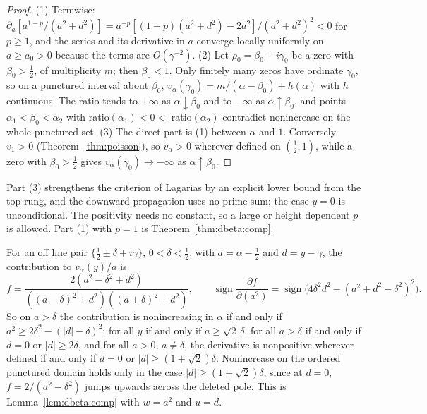 \begin{proof}
(1) Termwise: $\partial_a[a^{1-p}/(a^2+d^2)]=a^{-p}[(1-p)(a^2+d^2)-2a^2]/(a^2+d^2)^2<0$ for $p\ge1$, and the series and its derivative in $a$ converge locally uniformly on $a\ge a_0>0$ because the terms are $O(\gamma^{-2})$. (2) Let $\rho_0=\beta_0+i\gamma_0$ be a zero with $\beta_0>\tfrac12$, of multiplicity $m$; then $\beta_0<1$. Only finitely many zeros have ordinate $\gamma_0$, so on a punctured interval about $\beta_0$, $v_\alpha(\gamma_0)=m/(\alpha-\beta_0)+h(\alpha)$ with $h$ continuous. The ratio tends to $+\infty$ as $\alpha\downarrow\beta_0$ and to $-\infty$ as $\alpha\uparrow\beta_0$, and points $\alpha_1<\beta_0<\alpha_2$ with ratio$(\alpha_1)<0<$ ratio$(\alpha_2)$ contradict nonincrease on the whole punctured set. (3) The direct part is (1) between $\alpha$ and $1$. Conversely $v_1>0$ (Theorem~\ref{thm:poisson}), so $v_\alpha>0$ wherever defined on $(\tfrac12,1)$, while a zero with $\beta_0>\tfrac12$ gives $v_\alpha(\gamma_0)\to-\infty$ as $\alpha\uparrow\beta_0$.
\end{proof}

Part (3) strengthens the criterion of Lagarias by an explicit lower bound from the top rung, and the downward propagation uses no prime sum; the case $y=0$ is unconditional. The positivity needs no constant, so a large or height dependent $p$ is allowed. Part (1) with $p=1$ is Theorem~\ref{thm:dbeta:comp}.

\begin{lemma}\label{qt:lem:pairdiff}
For an off line pair $\{\tfrac12\pm\delta+i\gamma\}$, $0<\delta<\tfrac12$, with $a=\alpha-\tfrac12$ and $d=y-\gamma$, the contribution to $v_\alpha(y)/a$ is
\[
f=\frac{2(a^2-\delta^2+d^2)}{((a-\delta)^2+d^2)((a+\delta)^2+d^2)},\qquad\operatorname{sign}\frac{\partial f}{\partial(a^2)}=\operatorname{sign}\big(4\delta^2d^2-(a^2+d^2-\delta^2)^2\big).
\]
So on $a>\delta$ the contribution is nonincreasing in $\alpha$ if and only if $a^2\ge2\delta^2-(|d|-\delta)^2$: for all $y$ if and only if $a\ge\sqrt2\,\delta$, for all $a>\delta$ if and only if $d=0$ or $|d|\ge2\delta$, and for all $a>0$, $a\ne\delta$, the derivative is nonpositive wherever defined if and only if $d=0$ or $|d|\ge(1+\sqrt2)\delta$. Nonincrease on the ordered punctured domain holds only in the case $|d|\ge(1+\sqrt2)\delta$, since at $d=0$, $f=2/(a^2-\delta^2)$ jumps upwards across the deleted pole. This is Lemma~\ref{lem:dbeta:comp} with $w=a^2$ and $u=d$.
\end{lemma}

